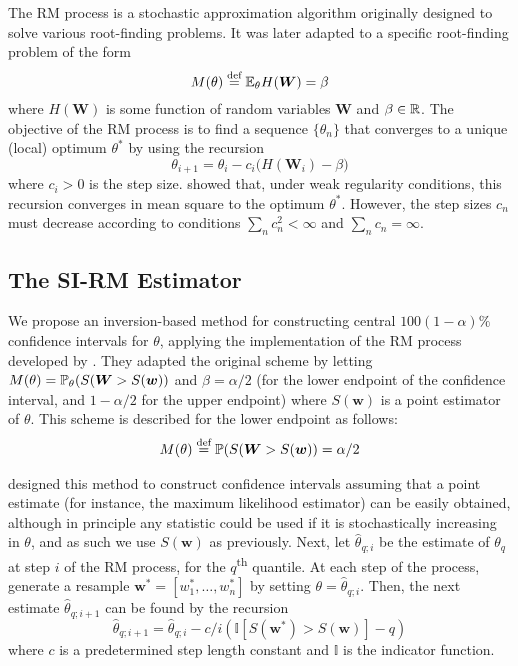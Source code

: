 The RM process is a stochastic approximation algorithm originally designed to solve various root-finding problems. It was later adapted to a specific root-finding problem of the form \cite{Fu2015} \[
M(\theta) \overset{\text{def}}{=} \mathbb{E}_\theta H(\bm{W}) = \beta
\] where $H(\bm{W})$ is some function of random variables $\bm{W}$ and $\beta \in \mathbb{R}$. The objective of the RM process is to find a sequence $\{\theta_n\}$ that converges to a unique (local) optimum $\theta^*$ by using the recursion \cite{LlyodBotev2015}
\[ \theta_{i+1} = \theta_i - c_i \Big( H(\bm{W}_i) - \beta \Big) \]
where $c_i > 0$ is the step size. \citet{RobbinsMonro1951} showed that, under weak regularity conditions, this recursion converges in mean square to the optimum $\theta^*$. However, the step sizes $c_n$ must decrease according to conditions $\sum_nc_n^2 < \infty$ and $\sum_n c_n = \infty$.

\subsection{The SI-RM Estimator}

We propose an inversion-based method for constructing central $100(1-\alpha)\%$ confidence intervals for $\theta$, applying the implementation of the RM process developed by \citet{Garthwaite1992}. They adapted the original scheme by letting $M(\theta) = \mathbb{P}_\theta(S(\bm{W} > S(\bm{w}))$ and $\beta = \alpha/2$ (for the lower endpoint of the confidence interval, and $1-\alpha/2$ for the upper endpoint) where $S(\bm{w})$ is a point estimator of $\theta$. This scheme is described for the lower endpoint as follows:
\begin{align*}
    M(\theta) \overset{\text{def}}{=} \mathbb{P}(S(\bm{W} > S(\bm{w})) = \alpha/2
\end{align*}

\citet{Garthwaite1992} designed this method to construct confidence intervals assuming that a point estimate (for instance, the maximum likelihood estimator) can be easily obtained, although in principle any statistic could be used if it is stochastically increasing in $\theta$, and as such we use $S(\bm{w})$ as previously. Next, let $\hat\theta_{q; i}$ be the estimate of $\theta_q$ at step $i$ of the RM process, for the $q$\textsuperscript{th} quantile. At each step of the process, generate a resample $\bm{w}^* = [w_1^*, \dots, w_n^*]$ by setting $\theta = \hat\theta_{q; i}$. Then, the next estimate $\hat\theta_{q; i+1}$ can be found by the recursion
\begin{equation}\label{eqn: SIRM-recursion}
    \hat\theta_{q; i+1} = \hat\theta_{q; i} - c/i \left( \mathbb{I}\left[S(\bm{w^*}) > S(\bm{w})\right] - q \right)
\end{equation}
where $c$ is a predetermined step length constant and $\mathbb{I}$ is the indicator function.

